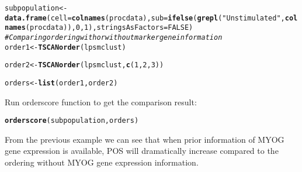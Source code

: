 \documentclass[10pt,oneside]{article}\usepackage[]{graphicx}\usepackage[]{color}
\makeatletter
\newcommand{\hlnum}[1]{\textcolor[rgb]{0.686,0.059,0.569}{#1}}%
\newcommand{\hlstr}[1]{\textcolor[rgb]{0.192,0.494,0.8}{#1}}%
\newcommand{\hlcom}[1]{\textcolor[rgb]{0.678,0.584,0.686}{\textit{#1}}}%
\newcommand{\hlstd}[1]{\textcolor[rgb]{0.345,0.345,0.345}{#1}}%
\newcommand{\hlkwb}[1]{\textcolor[rgb]{0.69,0.353,0.396}{#1}}%
\newcommand{\hlkwc}[1]{\textcolor[rgb]{0.333,0.667,0.333}{#1}}%
\newcommand{\hlkwd}[1]{\textcolor[rgb]{0.737,0.353,0.396}{\textbf{#1}}}%
\newenvironment{kframe}{%
 \def\at@end@of@kframe{}%
 \ifinner\ifhmode%
  \def\at@end@of@kframe{\end{minipage}}%
  \begin{minipage}{\columnwidth}%
 \fi\fi%
 \def\FrameCommand##1{\hskip\@totalleftmargin \hskip-\fboxsep
 \colorbox{shadecolor}{##1}\hskip-\fboxsep
     \hskip-\linewidth \hskip-\@totalleftmargin \hskip\columnwidth}%
 \MakeFramed {\advance\hsize-\width
   \@totalleftmargin\z@ \linewidth\hsize
   \@setminipage}}%
 {\par\unskip\endMakeFramed%
 \at@end@of@kframe}
\newenvironment{knitrout}{}{} %
\makeatother
\begin{document}
\begin{knitrout}
\color{fgcolor}\begin{kframe}
\begin{alltt}
\hlstd{subpopulation} \hlkwb{<-} \hlkwd{data.frame}\hlstd{(}\hlkwc{cell} \hlstd{=} \hlkwd{colnames}\hlstd{(procdata),} \hlkwc{sub} \hlstd{=} \hlkwd{ifelse}\hlstd{(}\hlkwd{grepl}\hlstd{(}\hlstr{"Unstimulated"}\hlstd{,}\hlkwd{colnames}\hlstd{(procdata)),}\hlnum{0}\hlstd{,}\hlnum{1}\hlstd{),} \hlkwc{stringsAsFactors} \hlstd{=} \hlnum{FALSE}\hlstd{)}
\hlcom{#Comparing ordering with or without marker gene information}
\hlstd{order1} \hlkwb{<-} \hlkwd{TSCANorder}\hlstd{(lpsmclust)}
\end{alltt}


{\ttfamily\noindent\bfseries{}}\begin{alltt}
\hlstd{order2} \hlkwb{<-} \hlkwd{TSCANorder}\hlstd{(lpsmclust,} \hlkwd{c}\hlstd{(}\hlnum{1}\hlstd{,}\hlnum{2}\hlstd{,}\hlnum{3}\hlstd{))}
\end{alltt}


{\ttfamily\noindent\bfseries{}}\begin{alltt}
\hlstd{orders} \hlkwb{<-} \hlkwd{list}\hlstd{(order1,order2)}
\end{alltt}


{\ttfamily\noindent\bfseries\color{errorcolor}{\#\# Error in eval(expr, envir, enclos): object 'order1' not found}}\end{kframe}
\end{knitrout}

Run orderscore function to get the comparison result:
\begin{knitrout}
\color{fgcolor}\begin{kframe}
\begin{alltt}
\hlkwd{orderscore}\hlstd{(subpopulation, orders)}
\end{alltt}


{\ttfamily\noindent\bfseries\color{errorcolor}{\#\# Error in lapply(X = X, FUN = FUN, ...): object 'orders' not found}}\end{kframe}
\end{knitrout}

From the previous example we can see that when prior information of MYOG gene expression is available, POS will dramatically increase compared to the ordering without MYOG gene expression information.
\end{document}
